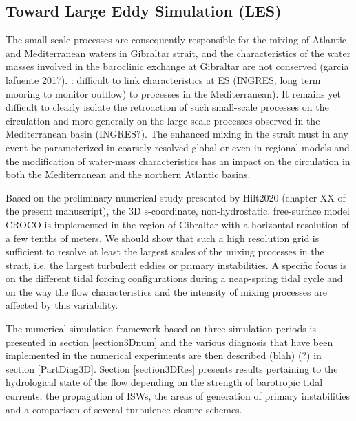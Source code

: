 \subsection{Toward Large Eddy Simulation (LES)}

The small-scale processes are consequently responsible for the mixing of Atlantic and Mediterranean waters in Gibraltar strait, and the characteristics of the water masses involved in the baroclinic exchange at Gibraltar are not conserved (garcia lafuente 2017). \color{blue} \sout{: difficult to link characteristics at ES (INGRES, long term mooring to monitor outflow) to processes in the Mediterranean).} It remains yet difficult to clearly isolate the retroaction of such small-scale processes on the circulation and more generally on the large-scale processes observed in the Mediterranean basin  (INGRES?). \color{black}
The enhanced mixing in the strait must in any event be \color{black}parameterized in coarsely-resolved global or even in regional models and the modification of water-mass characteristics \color{black} has an impact on the circulation in both the Mediterranean and the northern Atlantic basins. 

Based on the preliminary numerical study presented by Hilt2020 \color{blue}(chapter XX of the present manuscript), the 3D s-coordinate, non-hydrostatic, free-surface model CROCO is implemented in the region of Gibraltar with a horizontal resolution of a few tenths of meters. We should show that such a high resolution grid is sufficient to resolve at least the largest scales of the mixing processes in the strait, i.e. the largest turbulent eddies or primary instabilities. A specific focus is on the \color{black} different tidal forcing configurations during a neap-spring tidal cycle \color{blue} and on the way the flow characteristics and the intensity of mixing processes are affected by this variability. \color{black}

The numerical simulation framework \color{blue} based on three simulation periods is presented in section \ref{section3Dnum} and the various diagnosis that have been implemented in the numerical experiments are then described (blah) (?) in section \ref{PartDiag3D}. Section \ref{section3DRes} presents results pertaining to the hydrological state of the flow depending on the strength of barotropic tidal currents, the propagation of ISWs, the areas of generation of primary instabilities and a comparison of several turbulence closure schemes.\color{black}

